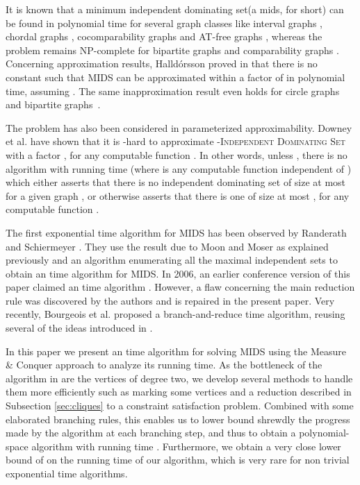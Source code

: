 \documentclass[a4paper,10pt]{article}
\theoremstyle{plain}
\theoremstyle{definition}
\theoremstyle{remark}
\newcommand{\ids}{independent dominating set\xspace}
\newcommand{\MIDSpb}{\textsc{MIDS}\xspace}
\newcommand{\mids}{mids\xspace}
\begin{document}
\medskip

It is known that a minimum \ids (a \mids, for short) can be found in polynomial time for
several graph classes like interval graphs \cite{Chang}, chordal graphs \cite{Farber},
cocomparability graphs \cite{Kratsch} and AT-free graphs \cite{Broersma}, whereas the problem
remains NP-complete for bipartite graphs \cite{Corneil} and comparability
graphs \cite{Corneil}.
Concerning approximation results, Halld\'orsson proved in \cite{Halldorsson}
that there is no constant  such that \MIDSpb can be approximated
within a factor of  in polynomial time, assuming .
The same inapproximation result even holds for circle graphs and bipartite graphs~\cite{Damian}.

The problem has also been considered in parameterized approximability.
Downey et al. \cite{Downey} have shown 
that it is -hard to approximate -\textsc{Independent Dominating Set}
with a factor , for any computable function .
In other words, unless ,
there is no algorithm with running time  (where  is any computable
function independent of ) which either asserts that there is no \ids
of size at most  for a given graph , or otherwise asserts
that there is one of size at most , for any computable function .

The first exponential time algorithm for \MIDSpb has been observed by Randerath and Schiermeyer \cite{Randerath}.
They use the result due to Moon and Moser \cite{MoonMoser} as explained
previously and an algorithm enumerating all the maximal independent sets
to obtain an  time algorithm for \MIDSpb.
In 2006, an earlier conference version of this paper claimed an
 time algorithm \cite{WG2006}. However, a flaw concerning 
the main reduction rule was discovered
by the authors and is repaired in the present paper.
Very recently, Bourgeois et al. \cite{BourgeoisSIROCCO2010} proposed a branch-and-reduce  time algorithm,
reusing several of the ideas introduced in \cite{WG2006}.


\smallskip

In this paper we present an  time algorithm for solving \MIDSpb
using the Measure \& Conquer approach to analyze its running time.
As the bottleneck
of the algorithm in \cite{Randerath} are the vertices of degree two, we develop several methods
to handle them more efficiently such as marking some vertices and a
reduction described in Subsection \ref{sec:cliques} to a constraint satisfaction problem.
Combined with some elaborated branching rules, this enables
us to lower bound shrewdly the progress made by the algorithm at each
branching step, and thus to obtain a polynomial-space algorithm with running time .
Furthermore, we obtain a very close lower bound of  on the running
time of our algorithm, which is very rare for non trivial exponential time algorithms.
\end{document}
